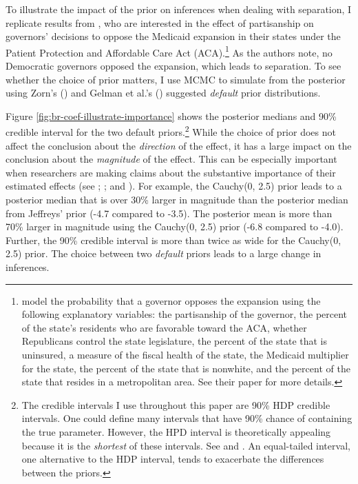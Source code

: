 \documentclass[12pt]{article}
\begin{document}
To illustrate the impact of the prior on inferences when dealing with separation, I replicate results from \cite{BarrilleauxRainey2014}, who are interested in the effect of partisanship on governors' decisions to oppose the Medicaid expansion in their states under the Patient Protection and Affordable Care Act (ACA).\footnote{
\cite{BarrilleauxRainey2014} model the probability that a governor opposes the expansion using the following explanatory variables: the partisanship of the governor, the percent of the state's residents who are favorable toward the ACA, whether Republicans control the state legislature, the percent of the state that is uninsured, a measure of the fiscal health of the state, the Medicaid multiplier for the state, the percent of the state that is nonwhite, and the percent of the state that resides in a metropolitan area. See their paper for more details.} 
As the authors note, no Democratic governors opposed the expansion, which leads to separation. 
To see whether the choice of prior matters, I use MCMC to simulate from the posterior using Zorn's (\citeyear{Zorn2005}) and Gelman et al.'s (\citeyear{Gelmanetal2008}) suggested \emph{default} prior distributions. 

Figure \ref{fig:br-coef-illustrate-importance} shows the posterior medians and 90\% credible interval for the two default priors.\footnote{
The credible intervals I use throughout this paper are 90\% HDP credible intervals. 
One could define many intervals that have 90\% chance of containing the true parameter.
 However, the HPD interval is theoretically appealing because it is the \emph{shortest} of these intervals. 
 See \citet[esp. pp. 48-51]{Gill2008} and \citet[esp. p. 448]{CasellaBerger2002}. 
 An equal-tailed interval, one alternative to the HDP interval, tends to exacerbate the differences between the priors.} 
 While the choice of prior does not affect the conclusion about the \emph{direction} of the effect, it has a large impact on the conclusion about the \emph{magnitude} of the effect. 
 This can be especially important when researchers are making claims about the substantive importance of their estimated effects (see \citealt{KingTomzWittenberg2000}; \citealt{Rainey2014a}; and \citealt{Gross2014}). 
 For example, the Cauchy(0, 2.5) prior leads to a posterior median that is over 30\% larger in magnitude than the posterior median from Jeffreys' prior (-4.7 compared to -3.5). 
 The posterior mean is more than 70\% larger in magnitude using the Cauchy(0, 2.5) prior (-6.8 compared to -4.0). 
 Further, the 90\% credible interval is more than twice as wide for the Cauchy(0, 2.5) prior. 
 The choice between two \emph{default} priors leads to a large change in inferences.
\end{document}
